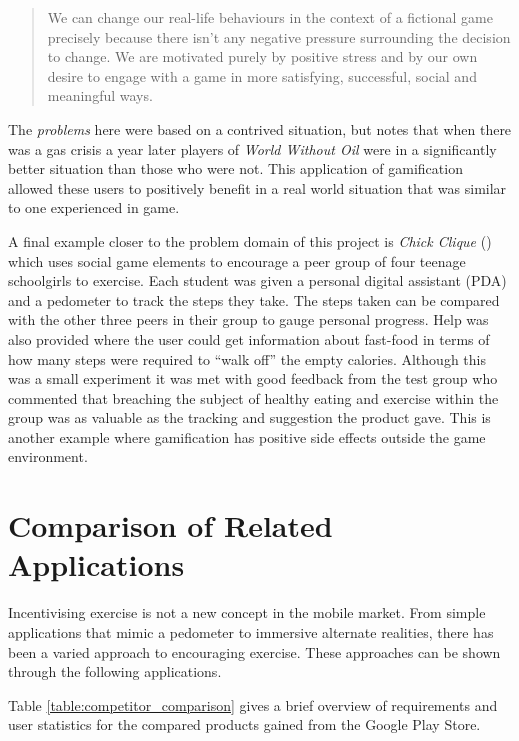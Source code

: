 \begin{quote}
  We can change our real-life
  behaviours in the context of a fictional game precisely because there
  isn't any negative pressure surrounding the decision to change. We
  are motivated purely by positive stress and by our own desire to
  engage with a game in more satisfying, successful, social and
  meaningful ways.
\end{quote}

The \emph{problems} here were based on a contrived situation, but
\citeauthor{reality_broken} notes that when there was a gas crisis a
year later players of \emph{World Without Oil} were in a significantly
better situation than those who were not. This application of
gamification allowed these users to positively benefit in a real world
situation that was similar to one experienced in game.

A final example closer to the problem domain of this project is
\emph{Chick Clique} (\citet{chick}) which uses social game elements to
encourage a peer group of four teenage schoolgirls to exercise. Each
student was given a personal digital assistant (PDA) and a pedometer
to track the steps they take. The steps taken can be compared with the
other three peers in their group to gauge personal progress. Help was
also provided where the user could get information about fast-food in
terms of how many steps were required to ``walk off'' the empty
calories. Although this was a small experiment it was met with good
feedback from the test group who commented that breaching the subject
of healthy eating and exercise within the group was as valuable as the
tracking and suggestion the product gave. This is another example
where gamification has positive side effects outside the game
environment.

\section{Comparison of Related Applications}\label{sec_comparison}
Incentivising exercise is not a new concept in the mobile market. From
simple applications that mimic a pedometer to immersive alternate
realities, there has been a varied approach to encouraging
exercise. These approaches can be shown through the following
applications. 

Table \ref{table:competitor_comparison} gives a brief
overview of requirements and user statistics for the compared products
gained from the Google Play Store.


